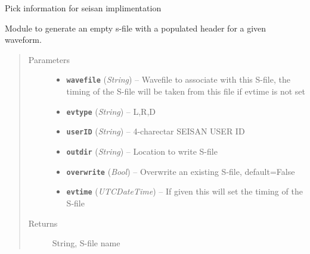 \documentclass[a4paper,10pt,english]{sphinxmanual}
\begin{document}
\begin{fulllineitems}
\label{utils:Sfile_util.PICK}
Pick information for seisan implimentation

\end{fulllineitems}


\begin{fulllineitems}
\label{utils:Sfile_util.blanksfile}
Module to generate an empty s-file with a populated header for a given
waveform.
\begin{quote}\begin{description}
\item[{Parameters}] \leavevmode\begin{itemize}
\item {} 
\textbf{\texttt{wavefile}} (\emph{String}) -- Wavefile to associate with this S-file, the timing of the
S-file will be taken from this file if evtime is not set

\item {} 
\textbf{\texttt{evtype}} (\emph{String}) -- L,R,D

\item {} 
\textbf{\texttt{userID}} (\emph{String}) -- 4-charectar SEISAN USER ID

\item {} 
\textbf{\texttt{outdir}} (\emph{String}) -- Location to write S-file

\item {} 
\textbf{\texttt{overwrite}} (\emph{Bool}) -- Overwrite an existing S-file, default=False

\item {} 
\textbf{\texttt{evtime}} (\emph{UTCDateTime}) -- If given this will set the timing of the S-file

\end{itemize}

\item[{Returns}] \leavevmode
String, S-file name

\end{description}\end{quote}

\end{fulllineitems}
\end{document}
